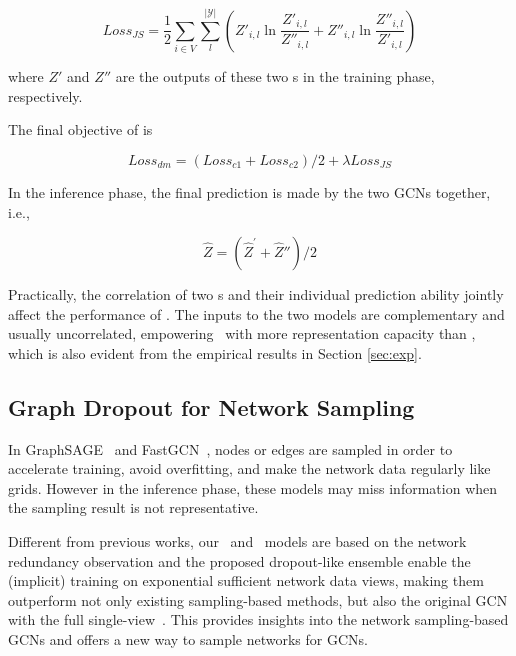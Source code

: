{{\begin{equation}
\label{equ:jsloss}
	Loss_{JS} = \frac{1}{2}\sum_{i\in V} \sum_l^{|\mathcal{Y}|} \left(Z'_{i,l} \ln \frac{Z'_{i,l}}{Z''_{i,l}} + Z''_{i,l} \ln \frac{Z''_{i,l}}{Z'_{i,l}}\right)
\end{equation}

\noindent where $Z'$ and $Z''$ are the outputs of these two \drop s in the training phase, respectively. 


The final objective of \sdm is

\begin{equation}
\label{equ:loss}
	Loss_{dm} = (Loss_{c1} + Loss_{c2})/2 + \lambda Loss_{JS}
\end{equation}

In the inference phase, the final prediction is made by the two GCNs together, i.e., 

\begin{equation}
\label{equ:inf}
	\hat{Z} = (\hat{Z}^{'} + \hat{Z}{''})/2
\end{equation}

Practically, the correlation of two \drop s and their individual prediction ability jointly affect the performance of \dm. 
The inputs to the two models are complementary  and usually uncorrelated, empowering \dm\ with more representation capacity than \drop, which is also evident from the empirical results in Section \ref{sec:exp}.  



\subsection{ Graph Dropout for Network Sampling}
In GraphSAGE~\cite{hamilton2017inductive} and FastGCN~\cite{chen2018fastgcn}, 
nodes or edges are sampled in order to accelerate training, avoid overfitting, and make the network data regularly like grids. However in the inference phase, these models may miss information when the sampling result is not representative. 

Different from previous works, our \drop\ and \dm\ models are based on the network redundancy observation and the proposed dropout-like ensemble enable the (implicit) training on exponential sufficient network data views, making them outperform not only existing sampling-based methods, but also the original GCN with the full single-view~\cite{kipf2016semi}. 
This provides 
insights into the network sampling-based GCNs and offers a new way to sample networks for GCNs.



}}
